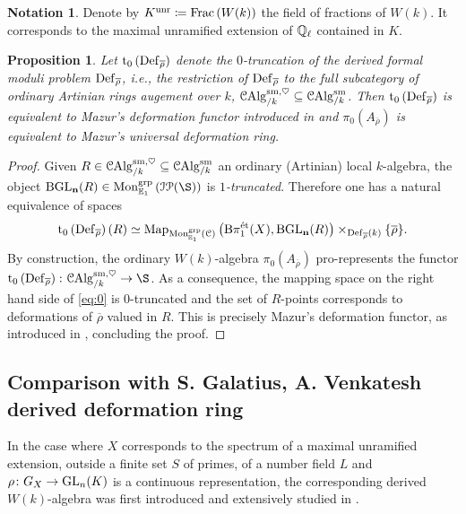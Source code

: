 \documentclass[10pt,a4paper]{amsart}
\numberwithin{equation}{subsection}
\theoremstyle{plain}
\newtheorem{prop}[theorem]{Proposition}
\theoremstyle{definition}
\newtheorem{notation}[theorem]{Notation}
\theoremstyle{remark}
\numberwithin{equation}{section}
\begin{document}
\begin{notation}
Denote by $K^{\mathrm{unr}} \coloneqq \mathrm{Frac} \left( W(k) \right)$ the field of fractions of $W(k)$. It corresponds to the maximal unramified extension of $\mathbb{Q}_\ell$ contained in $K$.
\end{notation}

\begin{prop}
Let $\mathrm t_0 \left( \mathbf{\mathrm{Def}}_{\overline{\rho}} \right)$ denote the $0$-truncation of the derived formal moduli problem $\mathbf{\mathrm{Def}}_{\overline{\rho}}$, i.e., the restriction of $\mathbf{\mathrm{Def}}_{\overline{\rho}}$ to the full subcategory of ordinary Artinian rings augement over $k$,
$\mathcal{C}\mathrm{Alg}_{/k }^{\mathrm{sm},\heartsuit} \subseteq \mathcal{C}\mathrm{Alg}_{/ k}^{\mathrm{sm}}$.
Then $\mathrm t_0 \left( \mathbf{\mathrm{Def}}_{\overline{\rho}} \right)$ is equivalent to Mazur's deformation functor introduced in \cite[Section 1.2]{mazurDG} and $\pi_0(A_{\overline{\rho}})$
is equivalent to Mazur's universal deformation ring.
\end{prop}

\begin{proof}
Given $R \in \mathcal{C}\mathrm{Alg}_{/k}^{\mathrm{sm}, \heartsuit} \subseteq \mathcal{C}\mathrm{Alg}_{/ k }^{\mathrm{sm}}$ an ordinary (Artinian) local $k$-algebra,
the object $\mathbf{ \mathrm B \GLn}(R) \in \Mon_{\mathbb E_1}^{\grp} \left( \cI \cP (\S) \right)$ is \emph{$1$-truncated}. Therefore one has a natural equivalence of spaces
	\begin{equation} \label{eq:0}
		\mathrm{t_0} \left( \mathbf{\mathrm{Def}}_{\overline{\rho}} \right) (R) \simeq \mathrm{Map}_{\mathrm{Mon}^{\mathrm{grp}}_{\mathbb E_1} \left( \mathcal C \right) } \left( \mathrm B \pi_1^{\text{\'et}}(X), \mathbf{ \mathrm B \mathrm{GL}_n}(R) \right) \times_{\mathbf{\mathrm{Def}}_{\overline{\rho}}(k)} \{ \overline{\rho} \}.
	\end{equation}
By construction, the ordinary $W(k)$-algebra $\pi_0(A_{\overline{\rho}})$ pro-represents the functor $\mathrm t_0 \left( \Def_{\overline{\rho}} \right) \colon \CAlg_{/k}^{\sm, \heartsuit} \to \S
$. As a consequence, the
mapping space on the right hand side of \eqref{eq:0} is $0$-truncated and the set of $R$-points corresponds to deformations of $\overline{\rho}$ valued in $R$. This is precisely Mazur's deformation functor, as introduced in \cite[Section 1.2]{mazurDG}, concluding
the proof.
\end{proof}

\subsection{Comparison with S. Galatius, A. Venkatesh derived deformation ring} In the case where $X $ corresponds to the spectrum of a maximal unramified extension, outside a finite set $S $ of primes, of a number field $L$ and $\rho \colon G_X \to \mathrm{GL}_n(K)$
is a continuous representation, the corresponding derived $W(k)$-algebra was first introduced and extensively studied in \cite{galatius_dg}.
\end{document}
